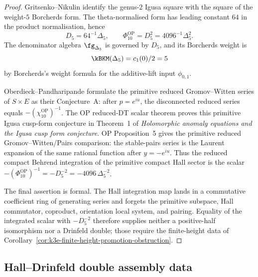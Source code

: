 \begin{proof}
Gritsenko--Nikulin identify the genus-$2$ Igusa square with the square
of the weight-$5$ Borcherds form. The theta-normalised form has leading
constant \(64\) in the product normalisation, hence
\[
 D_5=64^{-1}\Delta_5,\qquad
 \Phi_{10}^{\mathrm{OP}}=D_5^2=4096^{-1}\Delta_5^2.
\]
The denominator algebra \(\fg_{\Delta_5}\) is governed by \(D_5\), and
its Borcherds weight is
\[
 \kBKM(\Delta_5)=c_1(0)/2=5
\]
by Borcherds's weight formula for the additive-lift input
\(\phi_{0,1}\).

Oberdieck--Pandharipande formulate the primitive reduced
Gromov--Witten series of \(S\times E\) as their Conjecture~A:
after \(p=e^{iu}\), the disconnected reduced series equals
\(-(\chi_{10}^{\mathrm{OP}})^{-1}\). The OP reduced-DT scalar theorem
proves this primitive Igusa cusp-form conjecture in Theorem~1 of
\emph{Holomorphic anomaly equations and the Igusa cusp form
conjecture}. OP Proposition~5 gives the primitive reduced
Gromov--Witten/Pairs comparison: the stable-pairs series is the
Laurent expansion of the same rational function after
\(y=-e^{iu}\). Thus the reduced compact Behrend integration of the
primitive compact Hall sector is the scalar
\(-(\Phi_{10}^{\mathrm{OP}})^{-1}=-D_5^{-2}
=-4096\,\Delta_5^{-2}\).

The final assertion is formal. The Hall integration map lands in a
commutative coefficient ring of generating series and forgets the
primitive subspace, Hall commutator, coproduct, orientation local
system, and pairing. Equality of the integrated scalar with
\(-D_5^{-2}\) therefore supplies neither a positive-half isomorphism
nor a Drinfeld double; those require the finite-height data of
Corollary~\ref{cor:k3e-finite-height-promotion-obstruction}.
\end{proof}

\subsection{Hall--Drinfeld double assembly data}
\label{gluing:sec:k3xe-hall-drinfeld}

